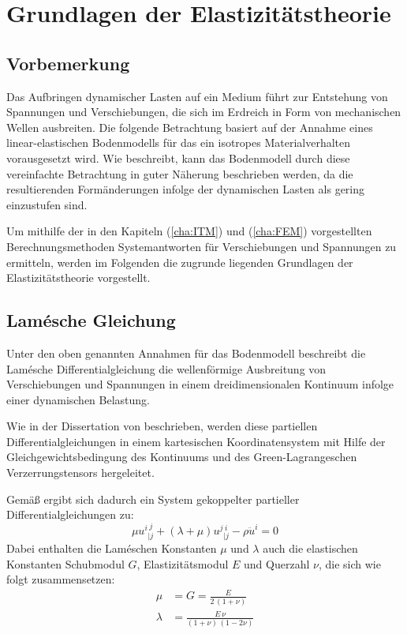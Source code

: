 \chapter{Grundlagen der Elastizitätstheorie}
\label{cha:Grundgleichungen}


\section{Vorbemerkung}
\label{sec:Vorbemerkung_Grundgleichungen}

Das Aufbringen dynamischer Lasten auf ein Medium führt zur Entstehung von Spannungen und Verschiebungen, die sich im Erdreich in Form von mechanischen Wellen ausbreiten. 
Die folgende Betrachtung basiert auf der Annahme eines linear-elastischen Bodenmodells für das ein isotropes Materialverhalten vorausgesetzt wird. Wie \cite{Haupt1986} beschreibt, kann das Bodenmodell durch diese vereinfachte Betrachtung in guter Näherung beschrieben werden, da die resultierenden Formänderungen infolge der dynamischen Lasten als gering einzustufen sind. 

Um mithilfe der in den Kapiteln (\ref{cha:ITM}) und (\ref{cha:FEM}) vorgestellten Berechnungsmethoden Systemantworten für Verschiebungen und Spannungen zu ermitteln, werden im Folgenden die zugrunde liegenden Grundlagen der Elastizitätstheorie vorgestellt. 

\section{Lamésche Gleichung}
\label{sec:Lame}
Unter den oben genannten Annahmen für das Bodenmodell beschreibt die Lamésche Differentialgleichung die wellenförmige Ausbreitung von Verschiebungen und Spannungen in einem dreidimensionalen Kontinuum infolge einer dynamischen Belastung. 

Wie in der Dissertation von \cite{Fruehe2010} beschrieben, werden diese partiellen Differentialgleichungen in einem kartesischen Koordinatensystem mit Hilfe der Gleichgewichtsbedingung des Kontinuums und des Green-Lagrangeschen Verzerrungstensors hergeleitet. 

Gemäß \cite{Lame1852} ergibt sich dadurch ein System gekoppelter partieller Differentialgleichungen zu: 
	\begin{equation}\label{eq:lame}
	\mu u^{i}{}_{|j}^{\,j} + (\lambda + \mu) u^{j}{}_{|j}^{\,i} - \rho \ddot{u}^{i} = 0
	\end{equation}
Dabei enthalten die Laméschen Konstanten \(\mu\) und \(\lambda\) auch die elastischen Konstanten Schubmodul \(G\), Elastizitätsmodul \(E\) und Querzahl \(\nu\), die sich wie folgt zusammensetzen:
\begin{subequations}\label{eq:lame_konstanten}
	\begin{align}
		\mu &= G = \frac{E}{2\,(1+\nu)}  \label{eq:lame_mu}\\
		\lambda &= \frac{E\,\nu}{(1+\nu)\,(1-2\nu)}  \label{eq:lame_lambda}
	\end{align}
\end{subequations}


